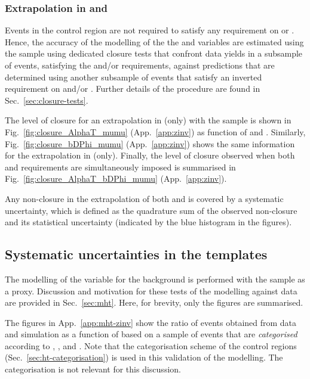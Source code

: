\subsubsection{Extrapolation in \texorpdfstring{\alphat}{AlphaT} and
  \texorpdfstring{\bdphi}{biased dPhi}}
\label{sec:tfSyst_alphaT-zinv}

Events in the \mmj control region are not required to satisfy any
requirement on \alphat or \bdphi. Hence, the accuracy of the modelling
of the the \alphat and \bdphi variables are estimated using the \mmj
sample using dedicated closure tests that confront data yields in a
subsample of \mmj events, satisfying the \alphat and/or \bdphi
requirements, against predictions that are determined using another
subsample of \mmj events that satisfy an inverted requirement on
\alphat and/or \bdphi. Further details of the procedure are found in
Sec.~\ref{sec:closure-tests}. 

The level of closure for an extrapolation in \alphat (only) with the
\mmj sample is shown in Fig.~\ref{fig:closure_AlphaT_mumu}
(App.~\ref{app:zinv}) as function of \scalht and \njet. Similarly,
Fig.~\ref{fig:closure_bDPhi_mumu} (App.~\ref{app:zinv}) shows the same
information for the extrapolation in \bdphi (only). Finally, the level
of closure observed when both \alphat and \bdphi requirements are
simultaneously imposed is summarised in
Fig.~\ref{fig:closure_AlphaT_bDPhi_mumu} (App.~\ref{app:zinv}).

Any non-closure in the extrapolation of both \alphat and \bdphi is
covered by a systematic uncertainty, which is defined as the
quadrature sum of the observed non-closure and its statistical
uncertainty (indicated by the blue histogram in the figures). 

\subsection{Systematic uncertainties in the \texorpdfstring{\HTmiss}{MHT} templates}
\label{sec:mht-zinv}

The modelling of the \mht variable for the \znunuj background is
performed with the \mmj sample as a proxy. Discussion and motivation
for these tests of the \mht modelling against data are provided in
Sec.~\ref{sec:mht}. Here, for brevity, only the figures are
summarised.

The figures in App.~\ref{app:mht-zinv} show the ratio of events
obtained from data and simulation as a function of \mht based on a
sample of \mmj events that are {\it categorised} according to \njet,
\scalht, and \nb. Note that the \scalht categorisation scheme of the
control regions (Sec.~\ref{sec:ht-categorisation}) is used in this
validation of the \mht modelling. The \nb categorisation is not
relevant for this discussion.

